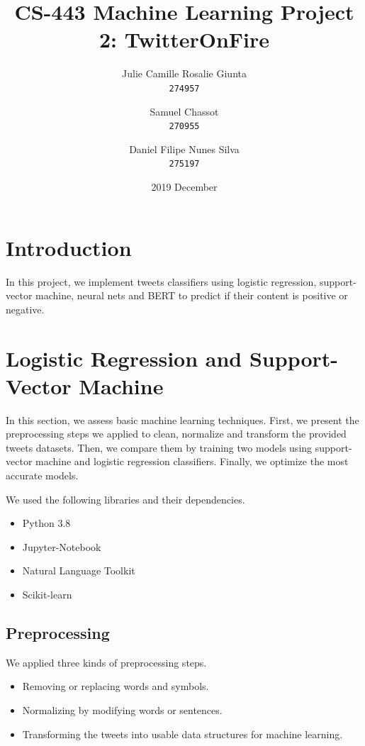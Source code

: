 \documentclass[11pt, a4paper, twocolumn]{article}
\begin{document}
\date{2019 December}
\title{CS-443 Machine Learning Project 2: TwitterOnFire}
\author{
  Julie Camille Rosalie Giunta\\
  \texttt{274957}
  \and
  Samuel Chassot\\
  \texttt{270955}
  \and
  Daniel Filipe Nunes Silva\\
  \texttt{275197}
}

\maketitle
\clearpage

\section{Introduction}
In this project, we implement tweets classifiers using logistic regression, support-vector machine, neural nets and BERT to predict if their content is positive or negative.

\section{Logistic Regression and Support-Vector Machine}
In this section, we assess basic machine learning techniques. First, we present the preprocessing steps we applied to clean, normalize and transform the provided tweets datasets. Then, we compare them by training two models using support-vector machine and logistic regression classifiers. Finally, we optimize the most accurate models.

We used the following libraries and their dependencies.
\begin{itemize}
	\setlength\itemsep{1px}
	\item Python 3.8
	\item Jupyter-Notebook
	\item Natural Language Toolkit
	\item Scikit-learn
\end{itemize}

\subsection{Preprocessing}
We applied three kinds of preprocessing steps.
\begin{itemize}
	\setlength\itemsep{1px}
	\item Removing or replacing words and symbols.
	\item Normalizing by modifying words or sentences.
	\item Transforming the tweets into usable data structures for machine learning.
\end{itemize}
\end{document}
